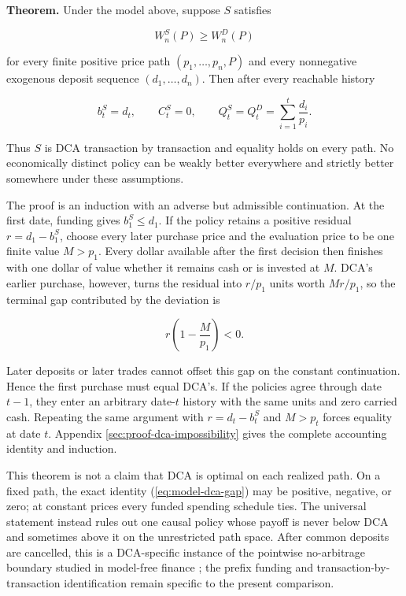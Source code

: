 \documentclass[12pt,a4paper,oneside]{report}
\begin{document}
\textbf{Theorem.} Under the model above, suppose $S$ satisfies

\begin{equation}
  W_n^S(P)\geq W_n^D(P)
  \label{eq:universal-dca-dominance}
\end{equation}

for every finite positive price path $(p_1,\ldots,p_n,P)$ and every
nonnegative exogenous deposit sequence $(d_1,\ldots,d_n)$. Then after every
reachable history

\begin{equation}
  b_t^S=d_t,\qquad C_t^S=0,\qquad
  Q_t^S=Q_t^D=\sum_{i=1}^{t}\frac{d_i}{p_i}.
  \label{eq:impossibility-collapse}
\end{equation}

Thus $S$ is DCA transaction by transaction and equality holds on every path.
No economically distinct policy can be weakly better everywhere and strictly
better somewhere under these assumptions.

The proof is an induction with an adverse but admissible continuation. At the
first date, funding gives $b_1^S\leq d_1$. If the policy retains a positive
residual $r=d_1-b_1^S$, choose every later purchase price and the evaluation
price to be one finite value $M>p_1$. Every dollar available after the first
decision then finishes with one dollar of value whether it remains cash or is
invested at $M$. DCA's earlier purchase, however, turns the residual into
$r/p_1$ units worth $Mr/p_1$, so the terminal gap contributed by the deviation
is

\begin{equation}
  r\left(1-\frac{M}{p_1}\right)<0.
  \label{eq:impossibility-adverse-gap}
\end{equation}

Later deposits or later trades cannot offset this gap on the constant
continuation. Hence the first purchase must equal DCA's. If the policies agree
through date $t-1$, they enter an arbitrary date-$t$ history with the same units
and zero carried cash. Repeating the same argument with
$r=d_t-b_t^S$ and $M>p_t$ forces equality at date $t$. Appendix
\ref{sec:proof-dca-impossibility} gives the complete accounting identity and
induction.

This theorem is not a claim that DCA is optimal on each realized path. On a
fixed path, the exact identity (\ref{eq:model-dca-gap}) may be positive,
negative, or zero; at constant prices every funded spending schedule ties.
The universal statement instead rules out one causal policy whose payoff is
never below DCA and sometimes above it on the unrestricted path space. After
common deposits are cancelled, this is a DCA-specific instance of the
pointwise no-arbitrage boundary studied in model-free finance
\citep{burzoni2019}; the prefix funding and transaction-by-transaction
identification remain specific to the present comparison.
\end{document}
